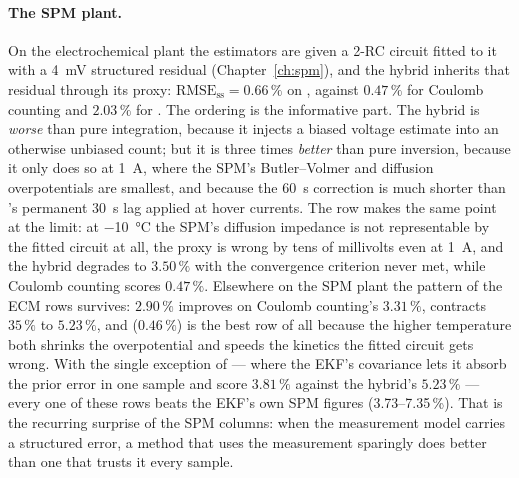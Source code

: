 \paragraph{The SPM plant.} On the electrochemical plant the estimators are given a 2-RC circuit
fitted to it with a \SI{4}{\milli\volt} structured residual (Chapter~\ref{ch:spm}), and the hybrid
inherits that residual through its proxy: $\text{RMSE}_{\text{ss}} = 0.66\,\%$ on ,
against $0.47\,\%$ for Coulomb counting and $2.03\,\%$ for . The ordering is the
informative part. The hybrid is \emph{worse} than pure integration, because it injects a biased
voltage estimate into an otherwise unbiased count; but it is three times \emph{better} than pure
inversion, because it only does so at \SI{1}{\ampere}, where the SPM's Butler--Volmer and diffusion
overpotentials are smallest, and because the \SI{60}{\second} correction is much shorter than
's permanent \SI{30}{\second} lag applied at hover currents. The  row
makes the same point at the limit: at \SI{-10}{\celsius} the SPM's diffusion impedance is not
representable by the fitted circuit at all, the proxy is wrong by tens of millivolts even at
\SI{1}{\ampere}, and the hybrid degrades to $3.50\,\%$ with the convergence criterion never met,
while Coulomb counting scores $0.47\,\%$. Elsewhere on the SPM plant the pattern of the ECM rows
survives:  $2.90\,\%$ improves on Coulomb counting's $3.31\,\%$,
 contracts $35\,\%$ to $5.23\,\%$, and  ($0.46\,\%$) is the best row of
all because the higher temperature both shrinks the overpotential and speeds the kinetics the fitted
circuit gets wrong. With the single exception of  --- where the EKF's covariance
lets it absorb the prior error in one sample and score $3.81\,\%$ against the hybrid's $5.23\,\%$
--- every one of these rows beats the EKF's own SPM figures (\numrange{3.73}{7.35}\,\%). That is the
recurring surprise of the SPM columns: when the measurement model carries a structured error, a
method that uses the measurement sparingly does better than one that trusts it every sample.

